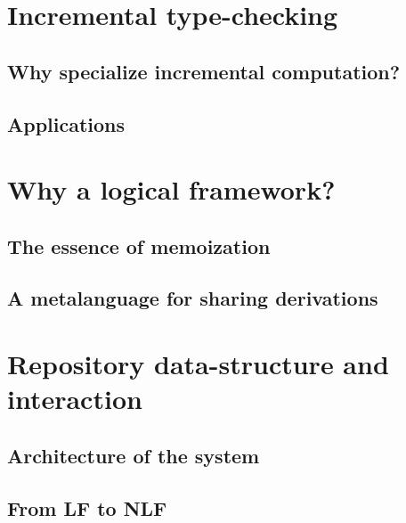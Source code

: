\documentclass[preprint]{sigplanconf}
\begin{document}

\section{Incremental type-checking} %


\subsection{Why specialize incremental computation?}

\subsection{Applications}

\section{Why a logical framework?} %

\subsection{The essence of memoization}

\subsection{A metalanguage for sharing derivations}



\section{Repository data-structure and interaction}


\subsection{Architecture of the system}

\subsection{From LF to NLF}
\end{document}
